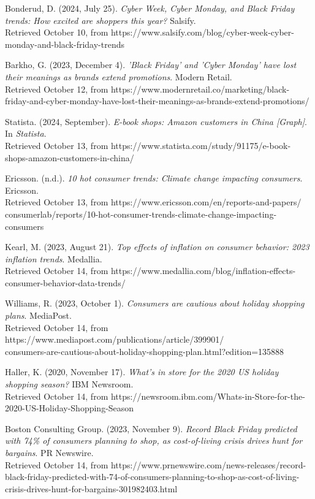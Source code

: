 \documentclass[12pt]{ctexart}
\begin{document}
\begin{thebibliography}{99}
     Bonderud, D. (2024, July 25). \textit{Cyber Week, Cyber Monday, and Black Friday trends: How excited are shoppers this year?} Salsify. \\ Retrieved October 10, from https://www.salsify.com/blog/cyber-week-cyber-monday-and-black-friday-trends

     Barkho, G. (2023, December 4). \textit{'Black Friday' and 'Cyber Monday' have lost their meanings as brands extend promotions}. Modern Retail.  \\ Retrieved October 12, from https://www.modernretail.co/marketing/black-friday-and-cyber-monday-have-lost-their-meanings-as-brands-extend-promotions/

     Statista. (2024, September). \textit{E-book shops: Amazon customers in China [Graph]}. In \textit{Statista}. \\ Retrieved October 13, from https://www.statista.com/study/91175/e-book-shops-amazon-customers-in-china/

     Ericsson. (n.d.). \textit{10 hot consumer trends: Climate change impacting consumers}. Ericsson. \\ Retrieved October 13, from  https://www.ericsson.com/en/reports-and-papers/\\consumerlab/reports/10-hot-consumer-trends-climate-change-impacting-consumers

     Kearl, M. (2023, August 21). \textit{Top effects of inflation on consumer behavior: 2023 inflation trends}. Medallia. \\ Retrieved October 14, from https://www.medallia.com/blog/inflation-effects-consumer-behavior-data-trends/

     Williams, R. (2023, October 1).  \textit{Consumers are cautious about holiday shopping plans}. MediaPost.  \\ Retrieved October 14, from https://www.mediapost.com/publications/article/399901/\\consumers-are-cautious-about-holiday-shopping-plan.html?edition=135888

     Haller, K. (2020, November 17). \textit{What's in store for the 2020 US holiday shopping season?} IBM Newsroom. \\ Retrieved October 14, from https://newsroom.ibm.com/Whats-in-Store-for-the-2020-US-Holiday-Shopping-Season

     Boston Consulting Group. (2023, November 9). \textit{Record Black Friday predicted with 74\% of consumers planning to shop, as cost-of-living crisis drives hunt for bargains}. PR Newswire. \\ Retrieved October 14, from https://www.prnewswire.com/news-releases/record-black-friday-predicted-with-74-of-consumers-planning-to-shop-as-cost-of-living-crisis-drives-hunt-for-bargains-301982403.html


\end{thebibliography}
\end{document}
